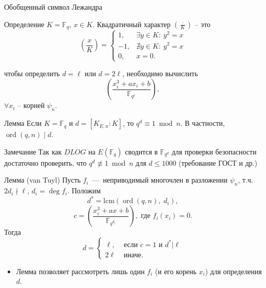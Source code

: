 \documentclass{beamer}
\begin{document}
\begin{frame}{Обобщенный символ Лежандра}
	\begin{block}{Определение}
		$K = \mathbb{F}_q$, $x \in K$. Квадратичный характер $\left( \frac{ \cdot }{K} \right)$ -- это 
		$$
		\left( \frac{x}{K} \right ) =
		\begin{cases}
			1,& \exists y \in K:\:{y^2} = x \\
			-1,& \nexists y \in K:\:{y^2} = x \\
			0, & x = 0.
		\end{cases}
		$$
	\end{block}
	\begin{center}
		\structure{$\Downarrow$}
	\end{center}
	чтобы определить $d = \ell$ или $d = 2\ell$, необходимо вычислить 
	\[
	\left(  {\frac{x_i^3 + a{x_i} + b}{\mathbb{F}_{q^\ell}}} \right ),
	\]
	$\forall x_i$ -- корней $\psi_n$. 
\end{frame}

\begin{frame}
	\begin{block}{Лемма}
		Если $K = \mathbb{F}_q$ и $d = [K_{E,n} : K]$, то $q^d \equiv 1 \bmod{n}$. В частности, $\operatorname{ord}(q,n) \mid d$.
	\end{block}
	
	\vspace*{1em}
	\begin{block}{Замечание}
		Так как $DLOG$ на $E(\mathbb{F}_q)$ сводится в $\mathbb{F}_{q^d}$ для проверки безопасности достаточно проверить, что $q^d \not\equiv 1 \bmod{n}$ для $d \leq 1000$ (требование ГОСТ и др.)
	\end{block}
\end{frame}

\begin{frame}%
	\begin{block}{Лемма (van Tuyl)}
		Пусть $f_i$~---~неприводимый многочлен в разложении ${\psi _n}$, т.ч. $2 d_i \nmid \ell$, $d_i = \deg f_i$. Положим
		\[
		{d^*} = \mathrm{lcm}( {\operatorname{ord} ( {q,n} ),\;{d_i}} ),
		\]
		\[
		c = \left(\frac{x_i^3 + a x + b}{\mathbb{F}_{q^{d_i}}} \right),{\text{ где }} f_i( x_i ) = 0.
		\]
		Тогда
		$$
		d = 
		\begin{cases}
			\ell, &\text{ если } c=1 \text{ и } d^*| \ell  \\
			2\ell & \text{ иначе. }
		\end{cases}
		$$
	\end{block}
	\begin{itemize}
		\item Лемма позволяет рассмотреть лишь один $f_i$ (и его корень $x_i$) для определения $d$. 
	\end{itemize}
\end{frame}
\end{document}
